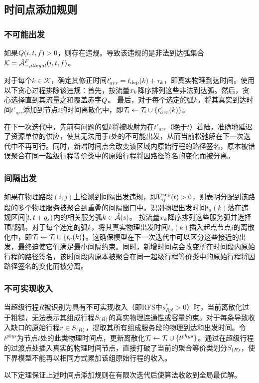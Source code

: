 
\subsection{时间点添加规则}\label{sec:refine_process}
\subsubsection*{不可能出发}
如果$\impDeparts(i, t, f) > 0$，则存在违规。导致该违规的是非法到达弧集合$\mathcal{K} = \flightArc[-,illegal](i, t, f)$。

对于每个$k \in \mathcal{K}$，确定其修正时间$t'_{arr} = t_{\text{dep}}(k) + \travelTime_k$，即真实物理到达时间。使用以下贪心过程排除该违规：首先，按流量$\fleetAssignVar_{k}$降序排列这些非法到达弧。然后，贪心选择直到其流量之和覆盖赤字$\impDeparts$。
最后，对于每个选定的弧$k$，将其真实到达时间$t'_{arr}$添加到节点$i$的时间离散化中，即$\discretization_i \gets \discretization_i \cup \{t'_{arr}(k)\}$。

在下一次迭代中，先前有问题的弧$k$将被映射为在$t'_{arr}$（晚于$t$）着陆，准确地延迟了资源单位的供应，使其无法用于$t$处的不可能出发，从而当前松弛解在下一次迭代中不再可行。同时，新增时间点会改变该区域内原始行程的路径签名，原本被错误聚合在同一超级行程等价类中的原始行程将因路径签名的变化而被分离。

\subsubsection*{间隔出发}
如果在物理路段$(i,j)$上检测到间隔出发违规，即$\sepViolAmount_{ij}(t) > 0$，则表明分配到该路段的多个物理服务被聚合到重叠的间隔窗口中。识别物理出发时间$t_a(k)$落在违规区间$[t, t + \minInterdepTime_{s})$内的相关服务弧$k \in \segArcSet{s}$。
按流量$\fleetAssignVar_{k}$降序排列这些服务弧并选择顶部弧。对于每个选定的弧$k$，将其真实物理出发时间$t_a(k)$插入起点节点$i$的离散化中，即$\discretization_i \gets \discretization_i \cup \{t_a(k)\}$。这确保模型在下一次迭代中可以区分这些接近的出发，最终迫使它们满足最小间隔约束。同时，新增时间点会改变所在时间段内原始行程的路径签名，该时间段内原本被聚合在同一超级行程等价类中的原始行程将因路径签名的变化而被分离。

\subsubsection*{不可实现收入}
当超级行程$R$被识别为具有不可实现收入（即RFS中$s_{Rpl}^* > 0$）时，当前离散化过于粗糙，无法表示其组成行程$\eqClassByPathSig_{(R)}$的真实物理连通性或容量约束。对于每条导致收入缺口的原始行程$r \in \eqClassByPathSig_{(R)}$，提取其所有组成服务段的物理到达和出发时间。令$t^{phys}$为节点$i$处的此类物理时间点，更新离散化$\discretization_i \gets \discretization_i \cup \{t^{phys}\}$。通过在超级行程的过渡点处插入真实的物理时间节点，直接打破了当前的聚合等价类划分$\eqClassByPathSig_{(R)}$，使下界模型不能再以相同方式累加该组原始行程的收入。

以下定理保证上述时间点添加规则在有限次迭代后使算法收敛到全局最优解。


